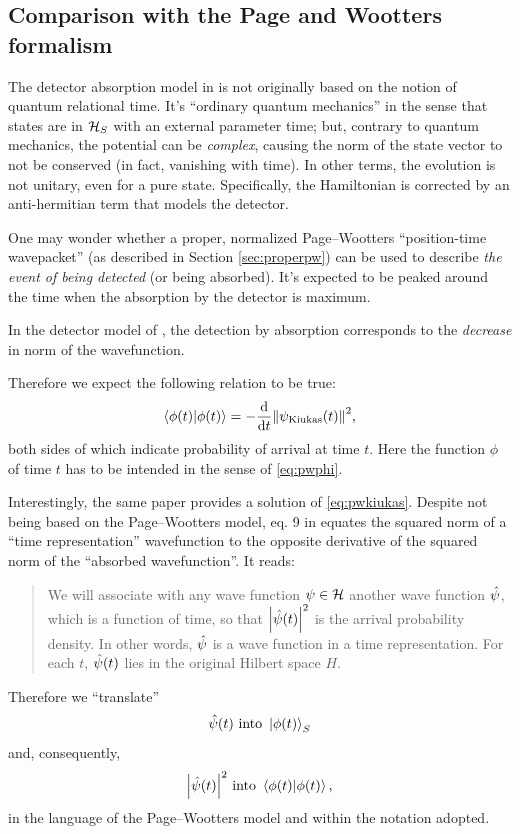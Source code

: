 \subsection{Comparison with the Page and Wootters formalism}
\label{sec:absorption+pw}

The detector absorption model in \cite{RuschhauptAbsorption} is not originally
based on the notion of quantum relational time. It's ``ordinary quantum mechanics''
in the sense that states are in $\mathcal{H}_S$ with an external parameter time;
but, contrary to quantum mechanics, the potential can be \emph{complex},
causing the norm of the state vector to not be conserved (in fact, vanishing with time).
In other terms, the evolution is not unitary, even for a pure state.
Specifically, the Hamiltonian is corrected by an anti-hermitian term
that models the detector.

One may wonder whether a proper, normalized Page--Wootters ``position-time wavepacket''
(as described in Section \ref{sec:properpw})
can be used to describe \emph{the event of being detected} (or being absorbed).
It's expected to be peaked around the time when the absorption by the detector is maximum.

\citereset
In the detector model of \cite{RuschhauptAbsorption}, the detection
by absorption
corresponds to the \emph{decrease} in norm of the wavefunction.

Therefore we expect the following relation to be true:
\begin{equation}\label{eq:pwkiukas}
  \braket{\phi(t)} = -\dv{t}\norm{\psi_{\text{Kiukas}}(t)}^2 \text{,}
\end{equation}
both sides of which indicate probability of arrival at time $t$.
Here the function $\phi$ of time $t$ has to be intended in the sense of
\eqref{eq:pwphi}.

\citereset
Interestingly, the same paper provides a solution of \eqref{eq:pwkiukas}.
Despite not being based on the Page--Wootters model, eq. 9 in \cite{RuschhauptAbsorption}
equates the squared norm of a ``time representation'' wavefunction
to the opposite derivative of the squared norm of the ``absorbed wavefunction''.
It reads:
\begin{quote}
  We will associate with any wave function $\psi \in \mathcal{H}$
  another wave function $\hat{\psi}$,
  which is a function of time, so that
  $\abs{\hat{\psi}(t)}^2$
  is the arrival probability density. In other words,
  $\hat{\psi}$ is a wave function in a time representation. For each
  $t$, $\hat{\psi}(t)$ lies in the original Hilbert space $H$.
\end{quote}
Therefore we ``translate''
$$\hat{\psi}(t) \text{ into } \ket{\phi(t)}_S$$
and, consequently,
$$\abs{\hat{\psi}(t)}^2 \text{ into } \braket{\phi(t)} \text{,}$$
in the language of the Page--Wootters model and within the notation
adopted.

